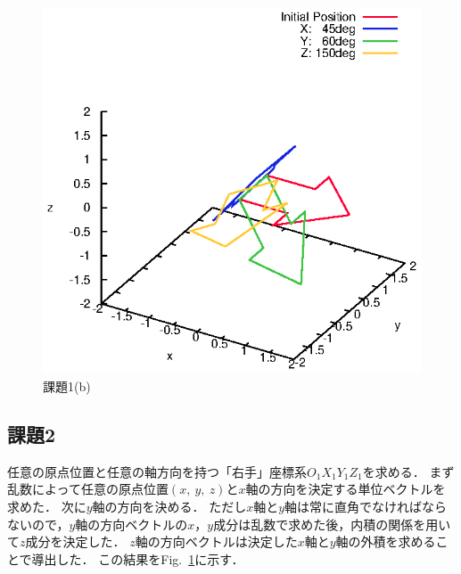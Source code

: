 \documentclass[a4paper,10pt]{jsarticle}
\begin{document}
\begin{figure}[tb]
  \begin{center}
    \includegraphics[clip,width=14cm]{fig/eps/1(b).eps}
  \end{center}
  \caption{課題1(b)}
  \label{fig:課題1(b)}
\end{figure}

\subsection{課題2}
任意の原点位置と任意の軸方向を持つ「右手」座標系$O_1X_1Y_1Z_1$を求める．
まず乱数によって任意の原点位置$(x,\ y,\ z)$と$x$軸の方向を決定する単位ベクトルを求めた．
次に$y$軸の方向を決める．
ただし$x$軸と$y$軸は常に直角でなければならないので，$y$軸の方向ベクトルの$x$，$y$成分は乱数で求めた後，内積の関係を用いて$z$成分を決定した．
$z$軸の方向ベクトルは決定した$x$軸と$y$軸の外積を求めることで導出した．
この結果をFig.~\ref{fig:課題1(b)}に示す．
\end{document}
